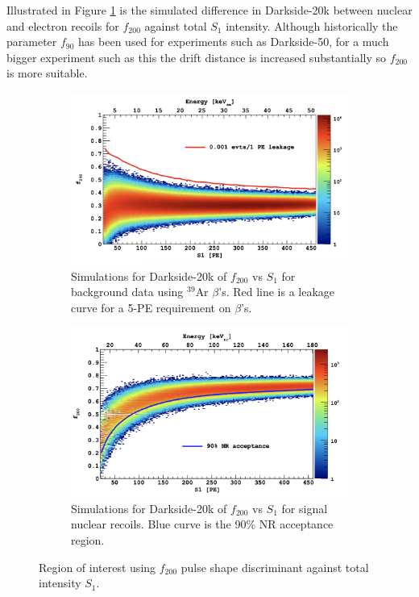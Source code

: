 \documentclass[11pt]{article} %
\begin{document}
Illustrated in Figure \ref{fig:psd} is the simulated difference in Darkside-20k between nuclear and electron recoils for $f_{200}$ against total $S_1$ intensity.
Although historically the parameter $f_{90}$ has been used for experiments such as Darkside-50, for a much bigger experiment such as this the drift distance is increased substantially so
$f_{200}$ is more suitable.
\begin{figure}[H]
\begin{minipage}{.49\textwidth}
  \centering
  \begin{subfigure}{\textwidth}
      \centering\captionsetup{width=.9\linewidth}%
      \includegraphics[width=\textwidth]{./images/psd_background.png}
      \caption{Simulations for Darkside-20k of $f_{200}$ vs $S_1$ for background data using $^{39}\mathrm{\text{Ar}}$ $\beta$'s.
      Red line is a leakage curve for a 5-PE requirement on $\beta$'s.}
  \end{subfigure}
\end{minipage}
\begin{minipage}{.49\textwidth}
  \centering
  \begin{subfigure}{\textwidth}
      \centering\captionsetup{width=.9\linewidth}%
      \includegraphics[width=\textwidth]{./images/psd_signal.png}
      \caption{Simulations for Darkside-20k of $f_{200}$ vs $S_1$ for signal nuclear recoils.
      Blue curve is the 90\% NR acceptance region.}
  \end{subfigure}
\end{minipage}
\caption{\cite{aalseth2018darkside} Region of interest using $f_{200}$ pulse shape discriminant against total intensity $S_1$.}
\label{fig:psd}
\end{figure}
\end{document}
